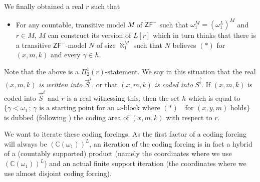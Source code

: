 \documentclass[a4paper,11pt]{article}
\newcommand{\ZFP}{\mathsf{ZF}^-}
\begin{document}
We finally obtained a real $r$ such that
\begin{itemize}
\item[$({\ast}{\ast}{\ast})$] For any countable, transitive model $M$ of $\ZFP$ such that $\omega_1^M=(\omega_1^L)^M$ and $ r  \in M$, $M$ can construct its version of $L[r]$ which in turn thinks that there is a transitive $\ZFP$-model $N$ of size $\aleph_1^M$  such that $N$ believes $(\ast)$ for $(x,m,k)$ and every $\gamma \in h$.
\end{itemize}

Note that the above is a $\Pi^1_2(r)$-statement.
We say in this situation that the real $(x,m,k)$\emph{ is written into $\vec{S}^i$}, or that $(x,m,k)$ \emph{is coded into} $\vec{S^i}$.
If $(x,m,k)$ is coded into $\vec{S}^i$ and $r$ is a real witnessing this, then the set $h$ which is equal to $\{ \gamma < \omega_1 \, ;\, \gamma \text{ is a starting point for an $\omega$-block where $(\ast)$ }$ for $(x,y,m)$ holds$\}$ is dubbed (following \cite{FS}) the coding area of $(x,m,k)$ with respect to $r$.

We want to iterate these coding forcings. As the first factor of a coding forcing will always be $(\mathbb{C}(\omega_1))^L$, an iteration of the coding forcing is in fact a hybrid of a (countably supported) product (namely the coordinates where we use $(\mathbb{C}(\omega_1))^L$)  and an actual finite support iteration (the coordinates where we use almost disjoint coding forcing).
\end{document}
